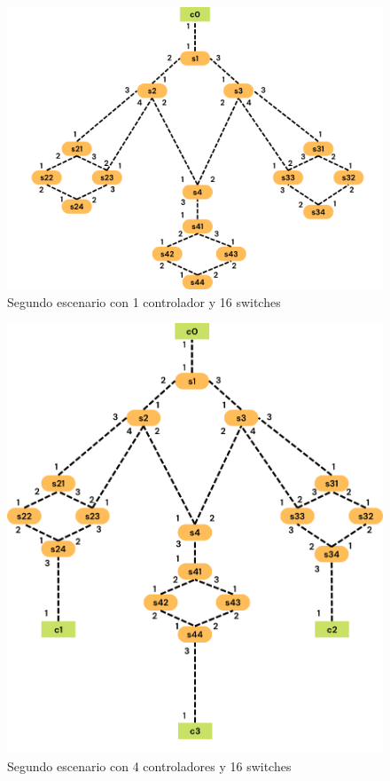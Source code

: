\documentclass[a4paper, 12pt]{book}
\begin{document}
 	\begin{figure}[H]
 		\centering
 		\includegraphics[width=16cm, keepaspectratio]{img/escenario2-1}
 		\caption{Segundo escenario con 1 controlador y 16 switches}
 		\label{figura:escenario2-1c}
 	\end{figure}
 	
 	\begin{figure}[H]
 		\centering
 		\includegraphics[width=14cm, keepaspectratio]{img/escenario2-2}
 		\caption{Segundo escenario con 4 controladores y 16 switches}
 		\label{figura:escenario2-4c}
 	\end{figure}
 	
\end{document}
